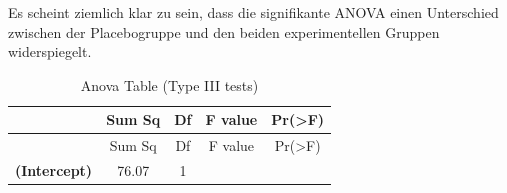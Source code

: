 \documentclass[]{article}
\begin{document}
Es scheint ziemlich klar zu sein, dass die signifikante ANOVA einen
Unterschied zwischen der Placebogruppe und den beiden experimentellen
Gruppen widerspiegelt.

\begin{longtable}[]{@{}ccccc@{}}
\caption{Anova Table (Type III tests)}\tabularnewline
\toprule
\begin{minipage}[b]{0.24\columnwidth}\centering\strut
~\strut
\end{minipage} & \begin{minipage}[b]{0.11\columnwidth}\centering\strut
Sum Sq\strut
\end{minipage} & \begin{minipage}[b]{0.06\columnwidth}\centering\strut
Df\strut
\end{minipage} & \begin{minipage}[b]{0.12\columnwidth}\centering\strut
F value\strut
\end{minipage} & \begin{minipage}[b]{0.13\columnwidth}\centering\strut
Pr(\textgreater{}F)\strut
\end{minipage}\tabularnewline
\midrule
\endfirsthead
\toprule
\begin{minipage}[b]{0.24\columnwidth}\centering\strut
~\strut
\end{minipage} & \begin{minipage}[b]{0.11\columnwidth}\centering\strut
Sum Sq\strut
\end{minipage} & \begin{minipage}[b]{0.06\columnwidth}\centering\strut
Df\strut
\end{minipage} & \begin{minipage}[b]{0.12\columnwidth}\centering\strut
F value\strut
\end{minipage} & \begin{minipage}[b]{0.13\columnwidth}\centering\strut
Pr(\textgreater{}F)\strut
\end{minipage}\tabularnewline
\midrule
\endhead
\begin{minipage}[t]{0.24\columnwidth}\centering\strut
\textbf{(Intercept)}\strut
\end{minipage} & \begin{minipage}[t]{0.11\columnwidth}\centering\strut
76.07\strut
\end{minipage} & \begin{minipage}[t]{0.06\columnwidth}\centering\strut
1\strut
\end{minipage} & \begin{minipage}[t]{0.12\columnwidth}\centering\strut

\end{minipage}
\end{longtable}
\end{document}
